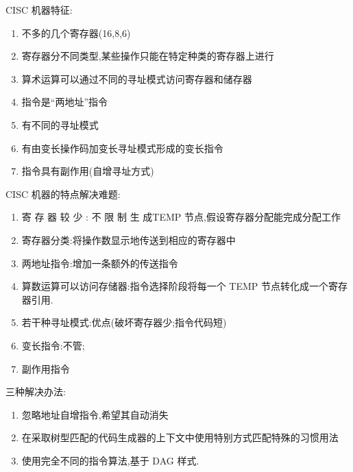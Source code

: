 CISC 机器特征:
\begin{enumerate}
    \item 不多的几个寄存器(16,8,6)
    \item 寄存器分不同类型,某些操作只能在特定种类的寄存器上进行
    \item 算术运算可以通过不同的寻址模式访问寄存器和储存器
    \item 指令是``两地址''指令
    \item 有不同的寻址模式
    \item 有由变长操作码加变长寻址模式形成的变长指令
    \item 指令具有副作用(自增寻址方式)
\end{enumerate}

CISC 机器的特点解决难题:
\begin{enumerate}
    \item  寄 存 器 较 少 : 不 限 制 生 成TEMP 节点,假设寄存器分配能完成分配工作
    \item 寄存器分类:将操作数显示地传送到相应的寄存器中
    \item 两地址指令:增加一条额外的传送指令
    \item 算数运算可以访问存储器:指令选择阶段将每一个 TEMP 节点转化成一个寄存器引用.
    \item 若干种寻址模式:优点(破坏寄存器少;指令代码短)
    \item 变长指令:不管;
    \item 副作用指令
\end{enumerate}

三种解决办法:
\begin{enumerate}
    \item 忽略地址自增指令,希望其自动消失
    \item 在采取树型匹配的代码生成器的上下文中使用特别方式匹配特殊的习惯用法
    \item 使用完全不同的指令算法,基于 DAG 样式.
\end{enumerate}
